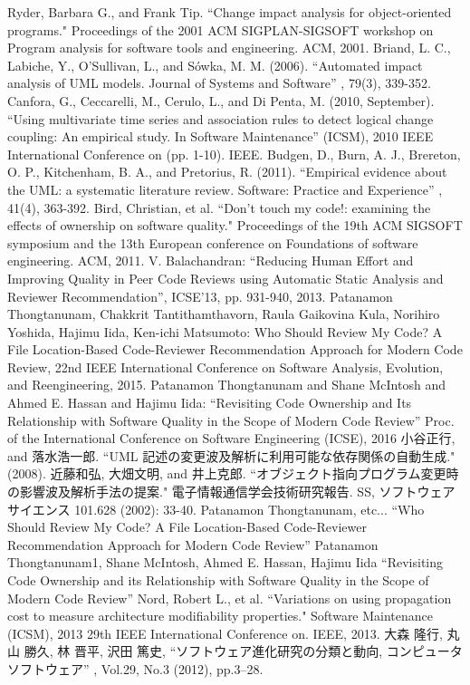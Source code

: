 \documentclass{fose2016}           %
\begin{document}
\begin{thebibliography}{10}
Ryder, Barbara G., and Frank Tip. ``Change impact analysis for object-oriented programs." Proceedings of the 2001 ACM SIGPLAN-SIGSOFT workshop on Program analysis for software tools and engineering. ACM, 2001.
Briand, L. C., Labiche, Y., O’Sullivan, L., and Sówka, M. M. (2006). 
``Automated impact analysis of UML models. Journal of Systems and Software''
, 79(3), 339-352.
 Canfora, G., Ceccarelli, M., Cerulo, L., and Di Penta, M. (2010, September). 
``Using multivariate time series and association rules to detect logical change coupling: An empirical study. In Software Maintenance''
  (ICSM), 2010 IEEE International Conference on (pp. 1-10). IEEE.
Budgen, D., Burn, A. J., Brereton, O. P., Kitchenham, B. A., and Pretorius, R. (2011). 
``Empirical evidence about the UML: a systematic literature review. Software: Practice and Experience''
, 41(4), 363-392.
Bird, Christian, et al. ``Don't touch my code!: examining the effects of ownership on software quality." Proceedings of the 19th ACM SIGSOFT symposium and the 13th European conference on Foundations of software engineering. ACM, 2011.
V. Balachandran: ``Reducing Human Effort and Improving Quality in Peer Code Reviews using Automatic Static Analysis and Reviewer Recommendation'', ICSE'13, pp. 931-940, 2013.
Patanamon Thongtanunam, Chakkrit Tantithamthavorn, Raula Gaikovina Kula, Norihiro Yoshida, Hajimu Iida, Ken-ichi Matsumoto: Who Should Review My Code? A File Location-Based Code-Reviewer Recommendation Approach for Modern Code Review, 22nd IEEE International Conference on Software Analysis, Evolution, and Reengineering, 2015.
Patanamon Thongtanunam and Shane McIntosh and Ahmed E. Hassan and Hajimu Iida: 
``Revisiting Code Ownership and Its Relationship with Software Quality in the Scope of Modern Code Review''
Proc. of the International Conference on Software Engineering (ICSE), 2016
小谷正行, and 落水浩一郎. ``UML 記述の変更波及解析に利用可能な依存関係の自動生成." (2008).
近藤和弘, 大畑文明, and 井上克郎. ``オブジェクト指向プログラム変更時の影響波及解析手法の提案." 電子情報通信学会技術研究報告. SS, ソフトウェアサイエンス 101.628 (2002): 33-40.
Patanamon Thongtanunam, etc...
``Who Should Review My Code? A File Location-Based Code-Reviewer Recommendation Approach for Modern Code Review''
Patanamon Thongtanunam1, Shane McIntosh, Ahmed E. Hassan, Hajimu Iida 
``Revisiting Code Ownership and its Relationship with Software Quality in the Scope of Modern Code Review''
Nord, Robert L., et al. ``Variations on using propagation cost to measure architecture modifiability properties." Software Maintenance (ICSM), 2013 29th IEEE International Conference on. IEEE, 2013.
大森 隆行, 丸山 勝久, 林 晋平, 沢田 篤史, ``ソフトウェア進化研究の分類と動向, コンピュータソフトウェア''
, Vol.29, No.3 (2012), pp.3–28.

\end{thebibliography}
\end{document}
